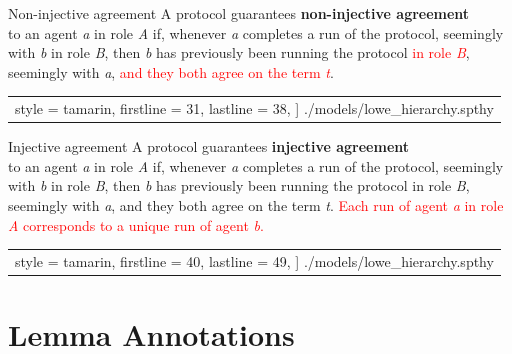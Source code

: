 \documentclass[11pt,aspectratio=169]{beamer}
\begin{document}
\begin{frame}[fragile,t]{Non-injective agreement}
    A protocol guarantees \textbf{non-injective agreement}\\ to an agent
    \textit{a} in role \textit{A} if, whenever \textit{a} completes a run of 
    the protocol, seemingly with \textit{b} in role \textit{B}, then \textit{b} 
    has previously been running the protocol \textcolor{red}{in role
    \textit{B}}, seemingly with \textit{a}, \textcolor{red}{and they both agree 
    on the term \textit{t}}.
    \vfill
    \begin{center}
        \begin{tabular}{c}
            
                style = tamarin,
                firstline = 31,
                lastline  = 38,
            ] {./models/lowe_hierarchy.spthy}
        \end{tabular}
    \end{center}
\end{frame}

\begin{frame}[fragile,t]{Injective agreement}
    A protocol guarantees \textbf{injective agreement}\\ to an agent \textit{a} 
    in role \textit{A} if, whenever \textit{a} completes a run of the protocol, 
    seemingly with \textit{b} in role \textit{B}, then \textit{b} has 
    previously been running the protocol in role \textit{B}, seemingly with 
    \textit{a}, and they both agree on the term \textit{t}.
    \textcolor{red}{Each run of agent \textit{a} in role \textit{A} corresponds 
    to a unique run of agent \textit{b}.}
    \vfill
    \begin{center}
        \begin{tabular}{c}
            
                style = tamarin,
                firstline = 40,
                lastline  = 49,
            ] {./models/lowe_hierarchy.spthy}
        \end{tabular}
    \end{center}
\end{frame}


\section{Lemma Annotations}

\end{document}
